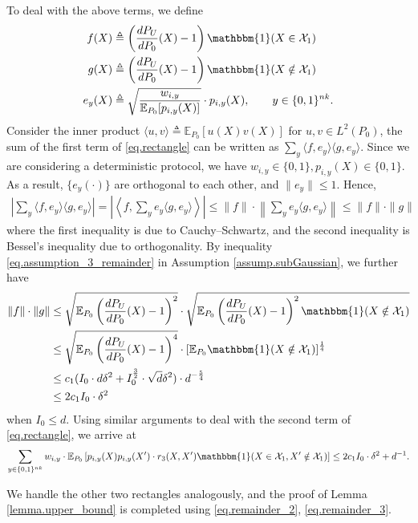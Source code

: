 \documentclass[final,12pt]{colt2018} %
\def \bE {\mathbb{E}}
\newcommand{\jiao}[1]{\langle{#1}\rangle}
\newcommand{\calX}{{\mathcal{X}}}
\begin{document}
To deal with the above terms, we define
\begin{align*}
f(X)&\triangleq \left(\frac{dP_U}{dP_0}(X) - 1\right)\mathbbm{1}(X\in\calX_1)\\ g(X)&\triangleq\left(\frac{dP_U}{dP_0}(X) - 1\right)\mathbbm{1}(X\notin\calX_1) \\ e_y(X)&\triangleq \sqrt{\frac{w_{i,y}}{\bE_{P_0}[p_{i,y}(X)] }}\cdot p_{i,y}(X),\qquad y\in \{0,1\}^{nk}. 
\end{align*} 
Consider the inner product $\jiao{u,v}\triangleq \bE_{P_0}[u(X)v(X)]$ for $u,v\in L^2(P_0)$, the sum of the first term of \eqref{eq.rectangle} can be written as $\sum_y \jiao{f,e_y}\jiao{g,e_y}$. Since we are considering a deterministic protocol, we have $w_{i,y}\in \{0,1\}, p_{i,y}(X)\in \{0,1\}$. As a result, $\{e_y(\cdot)\}$ are orthogonal to each other, and $\|e_y\|\le 1$. Hence, 
\begin{align*}
\left|\sum_y \jiao{f,e_y}\jiao{g,e_y}\right|  = \left|\left\langle f, \sum_y e_y\jiao{g,e_y}  \right\rangle \right| \le \|f\|\cdot \left\| \sum_y e_y\jiao{g,e_y}\right\| \le \|f\|\cdot \|g\|
\end{align*}
where the first inequality is due to Cauchy--Schwartz, and the second inequality is Bessel's inequality due to orthogonality. By inequality \eqref{eq.assumption_3_remainder} in Assumption \ref{assump.subGaussian}, we further have
\begin{align*}
\|f\|\cdot \|g\| &\le \sqrt{ \bE_{P_0}\left(\frac{dP_U}{dP_0}(X) - 1\right)^2 }\cdot \sqrt{ \bE_{P_0}\left(\frac{dP_U}{dP_0}(X) - 1\right)^2 \mathbbm{1}(X\notin \calX_1) } \\
&\le \sqrt{ \bE_{P_0}\left(\frac{dP_U}{dP_0}(X) - 1\right)^4 } \cdot [\bE_{P_0} \mathbbm{1}(X\notin \calX_1) ]^{\frac{1}{4}} \\
&\le c_1(I_0 \cdot d\delta^2 + I_0^{\frac{3}{2}}\cdot \sqrt{d}\delta^2  ) \cdot d^{-\frac{5}{4}}  \\
&\le 2c_1I_0\cdot \delta^2
\end{align*}
when $I_0\le d$. Using similar arguments to deal with the second term of \eqref{eq.rectangle}, we arrive at
\begin{align}\label{eq.remainder_3}
\sum_{y\in \{0,1\}^{nk}} w_{i,y}\cdot \bE_{P_0} \left[ p_{i,y}(X)p_{i,y}(X')\cdot r_3(X,X')\mathbbm{1}(X\in\calX_1, X'\notin \calX_1)\right] \le 2c_1I_0\cdot \delta^2 + d^{-1}. 
\end{align}

We handle the other two rectangles analogously, and the proof of Lemma \ref{lemma.upper_bound} is completed using \eqref{eq.remainder_2}, \eqref{eq.remainder_3}. 
\end{document}
